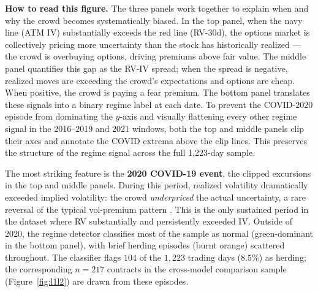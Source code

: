 \documentclass[12pt, letterpaper]{article}
\begin{document}
\textbf{How to read this figure.} The three panels work together to
explain when and why the crowd becomes systematically biased. In the
top panel, when the navy line (ATM IV) substantially exceeds the red
line (RV-30d), the options market is collectively pricing more
uncertainty than the stock has historically realized --- the crowd
is overbuying options, driving premiums above fair value. The middle
panel quantifies this gap as the RV-IV spread; when the spread is
negative, realized moves are exceeding the crowd's expectations and
options are cheap. When positive, the crowd is paying a fear premium.
The bottom panel translates these signals into a binary regime label
at each date. To prevent the COVID-2020 episode from dominating the
$y$-axis and visually flattening every other regime signal in the
2016--2019 and 2021 windows, both the top and middle panels clip
their axes and annotate the COVID extrema above the clip lines. This
preserves the structure of the regime signal across the full
1{,}223-day sample.

\newpage
The most striking feature is the \textbf{2020 COVID-19 event}, the
clipped excursions in the top and middle panels. During this period,
realized volatility dramatically exceeded implied volatility: the
crowd \textit{underpriced} the actual uncertainty, a rare reversal
of the typical vol-premium pattern \citep{Carr2009}. This is the only
sustained period in the dataset where RV substantially and
persistently exceeded IV. Outside of 2020, the regime detector
classifies most of the sample as normal (green-dominant in the
bottom panel), with brief herding episodes (burnt orange) scattered
throughout. The classifier flags $104$ of the $1{,}223$ trading days
($8.5\%$) as herding; the corresponding $n = 217$ contracts in the
cross-model comparison sample (Figure~\ref{fig:l1l2}) are drawn from
these episodes.
\end{document}
